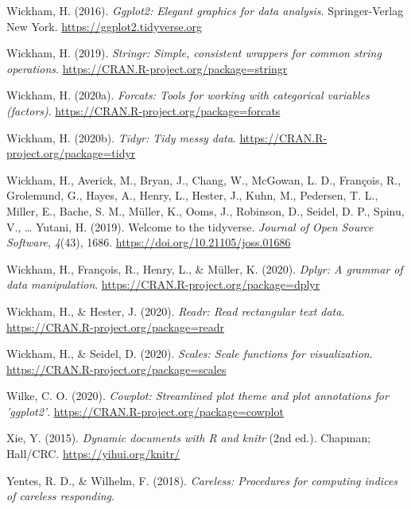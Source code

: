 \documentclass[
  english,
  man, noextraspace]{apa7}
\begin{document}
\begin{appendix}
\leavevmode\hypertarget{ref-R-ggplot2}{}%
Wickham, H. (2016). \emph{Ggplot2: Elegant graphics for data analysis}.
Springer-Verlag New York. \url{https://ggplot2.tidyverse.org}

\leavevmode\hypertarget{ref-R-stringr}{}%
Wickham, H. (2019). \emph{Stringr: Simple, consistent wrappers for
common string operations}.
\url{https://CRAN.R-project.org/package=stringr}

\leavevmode\hypertarget{ref-R-forcats}{}%
Wickham, H. (2020a). \emph{Forcats: Tools for working with categorical
variables (factors)}. \url{https://CRAN.R-project.org/package=forcats}

\leavevmode\hypertarget{ref-R-tidyr}{}%
Wickham, H. (2020b). \emph{Tidyr: Tidy messy data}.
\url{https://CRAN.R-project.org/package=tidyr}

\leavevmode\hypertarget{ref-R-tidyverse}{}%
Wickham, H., Averick, M., Bryan, J., Chang, W., McGowan, L. D.,
François, R., Grolemund, G., Hayes, A., Henry, L., Hester, J., Kuhn, M.,
Pedersen, T. L., Miller, E., Bache, S. M., Müller, K., Ooms, J.,
Robinson, D., Seidel, D. P., Spinu, V., \ldots{} Yutani, H. (2019).
Welcome to the tidyverse. \emph{Journal of Open Source Software},
\emph{4}(43), 1686. \url{https://doi.org/10.21105/joss.01686}

\leavevmode\hypertarget{ref-R-dplyr}{}%
Wickham, H., François, R., Henry, L., \& Müller, K. (2020). \emph{Dplyr:
A grammar of data manipulation}.
\url{https://CRAN.R-project.org/package=dplyr}

\leavevmode\hypertarget{ref-R-readr}{}%
Wickham, H., \& Hester, J. (2020). \emph{Readr: Read rectangular text
data}. \url{https://CRAN.R-project.org/package=readr}

\leavevmode\hypertarget{ref-R-scales}{}%
Wickham, H., \& Seidel, D. (2020). \emph{Scales: Scale functions for
visualization}. \url{https://CRAN.R-project.org/package=scales}

\leavevmode\hypertarget{ref-R-cowplot}{}%
Wilke, C. O. (2020). \emph{Cowplot: Streamlined plot theme and plot
annotations for 'ggplot2'}.
\url{https://CRAN.R-project.org/package=cowplot}

\leavevmode\hypertarget{ref-R-knitr}{}%
Xie, Y. (2015). \emph{Dynamic documents with R and knitr} (2nd ed.).
Chapman; Hall/CRC. \url{https://yihui.org/knitr/}

\leavevmode\hypertarget{ref-R-careless}{}%
Yentes, R. D., \& Wilhelm, F. (2018). \emph{Careless: Procedures for
computing indices of careless responding}.

\endgroup
\end{appendix}
\end{document}
